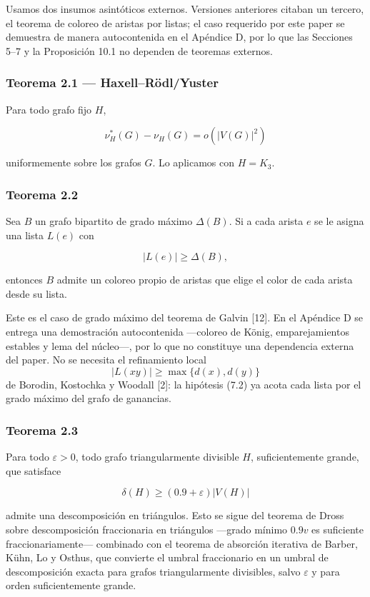\documentclass[
  11pt,
]{article}
\begin{document}
Usamos dos insumos asintóticos externos. Versiones anteriores citaban un
tercero, el teorema de coloreo de aristas por listas; el caso requerido
por este paper se demuestra de manera autocontenida en el Apéndice D,
por lo que las Secciones 5--7 y la Proposición 10.1 no dependen de
teoremas externos.

\subsubsection{Teorema 2.1 ---
Haxell--Rödl/Yuster}\label{teorema-2.1-haxellruxf6dlyuster}

Para todo grafo fijo \(H\),

\[
\nu_H^*(G)-\nu_H(G)=o(|V(G)|^2)
\]

uniformemente sobre los grafos \(G\). Lo aplicamos con \(H=K_3\).

\subsubsection{Teorema 2.2}\label{teorema-2.2-coloreo-de-aristas-por-listas-demostrado-en-el-apuxe9ndice-d}

Sea \(B\) un grafo bipartito de grado máximo \(\Delta(B)\). Si a cada
arista \(e\) se le asigna una lista \(L(e)\) con

\[
|L(e)|\ge\Delta(B),
\]

entonces \(B\) admite un coloreo propio de aristas que elige el color de
cada arista desde su lista.

Este es el caso de grado máximo del teorema de Galvin {[}12{]}. En el
Apéndice D se entrega una demostración autocontenida ---coloreo de
König, emparejamientos estables y lema del núcleo---, por lo que no
constituye una dependencia externa del paper. No se necesita el
refinamiento local \[
|L(xy)|\ge\max\{d(x),d(y)\}
\] de Borodin, Kostochka y Woodall {[}2{]}: la hipótesis (7.2) ya acota
cada lista por el grado máximo del grafo de ganancias.

\subsubsection{Teorema 2.3}\label{teorema-2.3-descomposiciuxf3n-densa-en-triuxe1ngulos}

Para todo \(\varepsilon>0\), todo grafo triangularmente divisible \(H\),
suficientemente grande, que satisface

\[
\delta(H)\ge(0.9+\varepsilon)|V(H)|
\]

admite una descomposición en triángulos. Esto se sigue del teorema de
Dross sobre descomposición fraccionaria en triángulos ---grado mínimo
\(0.9v\) es suficiente fraccionariamente--- combinado con el teorema de
absorción iterativa de Barber, Kühn, Lo y Osthus, que convierte el
umbral fraccionario en un umbral de descomposición exacta para grafos
triangularmente divisibles, salvo \(\varepsilon\) y para orden
suficientemente grande.
\end{document}

